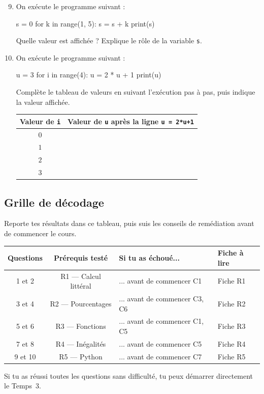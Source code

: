 \begin{enumerate}
  \setcounter{enumi}{8}

  \item On exécute le programme suivant :

\begin{python}
s = 0
for k in range(1, 5):
    s = s + k
print(s)
\end{python}

  Quelle valeur est affichée ? Explique le rôle de la variable \texttt{s}.

  \item On exécute le programme suivant :

\begin{python}
u = 3
for i in range(4):
    u = 2 * u + 1
print(u)
\end{python}

  Complète le tableau de valeurs en suivant l'exécution pas à pas, puis indique la valeur affichée.

  \begin{center}
  \begin{tabular}{|c|c|}
  \hline
  Valeur de \texttt{i} & Valeur de \texttt{u} après la ligne \texttt{u = 2*u+1} \\
  \hline
  $0$ & \phantom{xxx} \\
  \hline
  $1$ & \phantom{xxx} \\
  \hline
  $2$ & \phantom{xxx} \\
  \hline
  $3$ & \phantom{xxx} \\
  \hline
  \end{tabular}
  \end{center}

\end{enumerate}

\bigskip

\subsection*{Grille de décodage}

Reporte tes résultats dans ce tableau, puis suis les conseils de remédiation avant de commencer le cours.

\begin{center}
\begin{tabular}{|c|c|l|l|}
\hline
\textbf{Questions} & \textbf{Prérequis testé} & \textbf{Si tu as échoué...} & \textbf{Fiche à lire} \\
\hline
1 et 2 & R1 — Calcul littéral & ... avant de commencer C1 & Fiche R1 \\
\hline
3 et 4 & R2 — Pourcentages & ... avant de commencer C3, C6 & Fiche R2 \\
\hline
5 et 6 & R3 — Fonctions & ... avant de commencer C1, C5 & Fiche R3 \\
\hline
7 et 8 & R4 — Inégalités & ... avant de commencer C5 & Fiche R4 \\
\hline
9 et 10 & R5 — Python & ... avant de commencer C7 & Fiche R5 \\
\hline
\end{tabular}
\end{center}

\bigskip

Si tu as réussi toutes les questions sans difficulté, tu peux démarrer directement le Temps~3.
